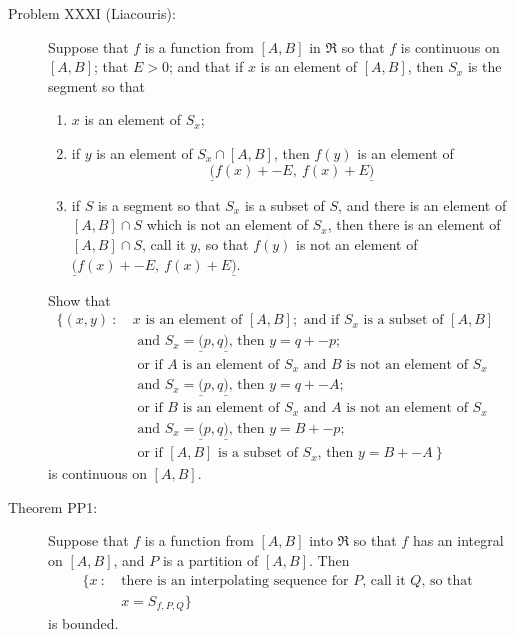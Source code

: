 \documentclass{article}
\begin{document}
\begin{description}
  \item[Problem XXXI (Liacouris):] Suppose that $f$ is a function from $[A,B]$ in $\Re$ so that $f$ is continuous on $[A,B]$; that $E > 0$; and that if $x$ is an element of $[A,B]$, then $S_{x}$ is the segment so that 
    \begin{enumerate}[\hspace{1cm}(i.)]
      \item $x$ is an element of $S_{x}$;
      \item if $y$ is an element of $S_{x} \cap [A,B]$, then $f(y)$ is an element of 
        \begin{equation*}
          \underline{(} f(x) + -E,\ f(x) + E \underline{)}
        \end{equation*}
      \item if $S$ is a segment so that $S_{x}$ is a subset of $S$, and there is an element of $[A,B] \cap S$ which is not an element of $S_{x}$, then there is an element of $[A,B] \cap S$, call it $y$, so that $f(y)$ is not an element of $\underline{(} f(x) + -E,\ f(x) + E \underline{)}$.
    \end{enumerate}
    Show that 
      \begin{align*}
      \{ (x,y)\ :\ & x \text{ is an element of } [A,B]; \text{ and if $S_{x}$ is a subset of $[A,B]$ } \\
                   & \text{ and $S_{x} = \underline{(} p,q \underline{)}$, then } y = q + -p; \\
                   & \text{ or if $A$ is an element of $S_{x}$ and $B$ is not an element of $S_{x}$ } \\
                   & \text{ and $S_{x} = \underline{(} p,q \underline{)}$, then } y = q + -A; \\
                   & \text{ or if $B$ is an element of $S_{x}$ and $A$ is not an element of $S_{x}$ } \\
                   & \text{ and $S_{x} = \underline{(} p,q \underline{)}$, then } y = B + -p; \\
                   & \text{ or if $[A,B]$ is a subset of $S_{x}$, then } y = B + -A \ \}
      \end{align*}
    is continuous on $[A,B]$. 

  \item[Theorem PP1:] Suppose that $f$ is a function from $[A,B]$ into $\Re$ so that $f$ has an integral on $[A,B]$, and $P$ is a partition of $[A,B]$. Then 
    \begin{align*}
    \{ x\ :\ & \text{there is an interpolating sequence for $P$, call it $Q$, so that } \\
             & x = S_{f,P,Q} \}
    \end{align*}
    is bounded.


\end{description}
\end{document}
